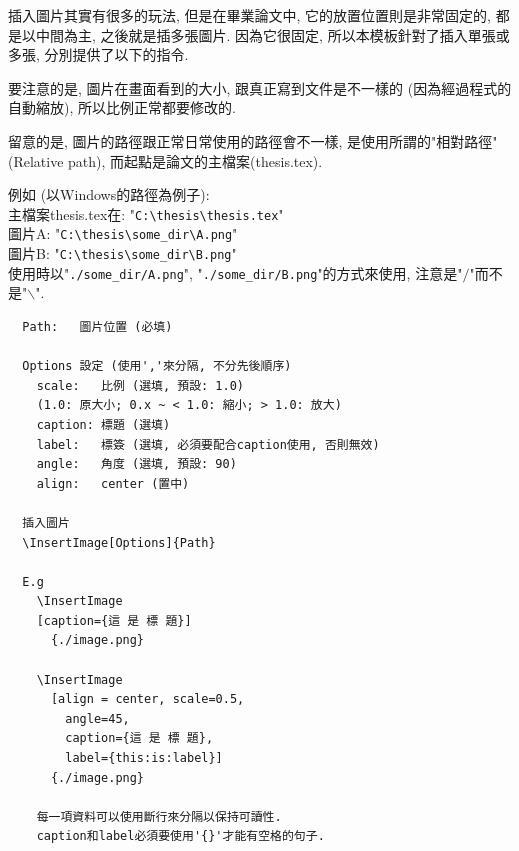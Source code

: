 

插入圖片其實有很多的玩法, 但是在畢業論文中, 它的放置位置則是非常固定的, 都是以中間為主, 之後就是插多張圖片. 因為它很固定, 所以本模板針對了插入單張或多張, 分別提供了以下的指令.

要注意的是, 圖片在畫面看到的大小, 跟真正寫到文件是不一樣的 (因為經過程式的自動縮放), 所以比例正常都要修改的.

留意的是, 圖片的路徑跟正常日常使用的路徑會不一樣, 是使用所謂的"相對路徑" (Relative path), 而起點是論文的主檔案(thesis.tex).

\noindent 例如 (以Windows的路徑為例子):\\
主檔案thesis.tex在: "\verb|C:\thesis\thesis.tex|"\\
圖片A: "\verb|C:\thesis\some_dir\A.png|"\\
圖片B: "\verb|C:\thesis\some_dir\B.png|"\\
使用時以"\verb|./some_dir/A.png|", "\verb|./some_dir/B.png|"的方式來使用, 注意是"$/$"而不是"$\backslash$".

\newpage
{}

  \begin{framed}
  \begin{verbatim}
  Path:   圖片位置 (必填)

  Options 設定 (使用','來分隔, 不分先後順序)
    scale:   比例 (選填, 預設: 1.0)
    (1.0: 原大小; 0.x ~ < 1.0: 縮小; > 1.0: 放大)
    caption: 標題 (選填)
    label:   標簽 (選填, 必須要配合caption使用, 否則無效)
    angle:   角度 (選填, 預設: 90)
    align:   center (置中)

  插入圖片
  \InsertImage[Options]{Path}

  E.g
    \InsertImage
    [caption={這 是 標 題}]
      {./image.png}

    \InsertImage
      [align = center, scale=0.5,
        angle=45,
        caption={這 是 標 題},
        label={this:is:label}]
      {./image.png}

    每一項資料可以使用斷行來分隔以保持可讀性.
    caption和label必須要使用'{}'才能有空格的句子.
  \end{verbatim}
  \end{framed}

